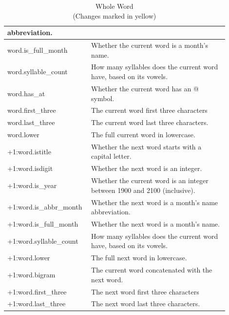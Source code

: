 \begin{table}[pt]
\begin{tabular}{|p{0.3\linewidth}|p{0.6\linewidth}|}
      abbreviation. \\
      \hline
      \rowcolor{blue}
      word.is\_full\_month & Whether the current word is a month's name. \\
      \hline
      \rowcolor{blue}
      word.syllable\_count & How many syllables does the current word have,
      based on its vowels. \\
      \hline
      \rowcolor{blue}
      word.has\_at & Whether the current word has an @ symbol. \\
      \hline
      \rowcolor{blue}
      word.first\_three & The current word first three characters \\
      \hline
      \rowcolor{blue}
      word.last\_three & The current word last three characters. \\
      \hline
      \rowcolor{pale_yellow}
      word.lower & The full current word in lowercase. \\
      \hline
      \rowcolor{light_blue}
      +1:word.istitle & Whether the next word starts with a capital letter. \\
      \hline
      \rowcolor{light_blue}
      +1:word.isdigit & Whether the next word is an integer. \\
      \hline
      \rowcolor{light_blue}
      +1:word.is\_year & Whether the current word is an integer between 1900
      and 2100 (inclusive). \\
      \hline
      \rowcolor{light_blue}
      +1:word.is\_abbr\_month & Whether the next word is a month's name
      abbreviation. \\
      \hline
      \rowcolor{light_blue}
      +1:word.is\_full\_month & Whether the next word is a month's name. \\
      \hline
      \rowcolor{light_blue}
      +1:word.syllable\_count & How many syllables does the current word have,
      based on its vowels. \\
      \hline
      \rowcolor{light_blue}
      +1:word.lower & The full next word in lowercase. \\
      \hline
      \rowcolor{light_blue}
      +1:word.bigram & The current word concatenated with the next word. \\
      \hline
      \rowcolor{light_blue}
      +1:word.first\_three & The next word first three characters \\
      \hline
      \rowcolor{light_blue}
      +1:word.last\_three & The next word last three characters. \\
      \hline
    \end{tabular}
    \caption{Whole Word \\ \textnormal{(Changes marked in yellow)}}
    \label{table:3}
  \end{table}




